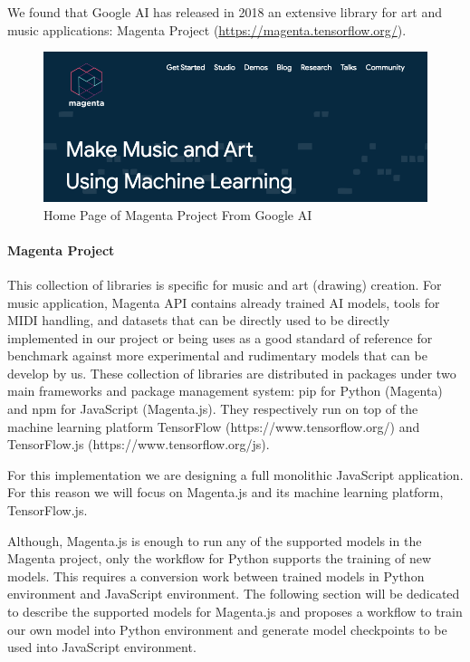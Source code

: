 We found that Google AI has released in 2018 an extensive library for art and music
applications: Magenta Project (\url{https://magenta.tensorflow.org/}).

\begin{figure}[h!]
  \centering
  \includegraphics[width=\linewidth]{image/fig_JDF01.png}
  \caption{Home Page of Magenta Project From Google AI}
\end{figure}

\paragraph{Magenta Project}

This collection of libraries is specific for music and art (drawing) creation.
For music application, Magenta API contains already trained AI models, tools for MIDI
handling, and datasets that can be directly used to be directly implemented in our
project or being uses as a good standard of reference for benchmark against more
experimental and rudimentary models that can be develop by us.
These collection of libraries are distributed in packages under two main frameworks
and package management system: pip for Python (Magenta) and npm for JavaScript
(Magenta.js). They respectively run on top of the machine learning platform TensorFlow
(https://www.tensorflow.org/) and TensorFlow.js (https://www.tensorflow.org/js).

For this implementation we are designing a full monolithic JavaScript application. For
this reason we will focus on Magenta.js and its machine learning platform,
TensorFlow.js.

Although, Magenta.js is enough to run any of the supported models in the Magenta
project, only the workflow for Python supports the training of new models. This
requires a conversion work between trained models in Python environment and
JavaScript environment. The following section will be dedicated to describe the
supported models for Magenta.js and proposes a workflow to train our own model into
Python environment and generate model checkpoints to be used into JavaScript
environment.

